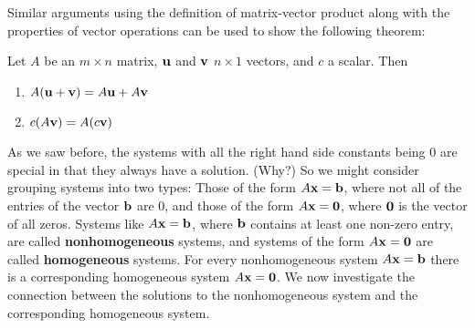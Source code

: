 Similar arguments using the definition of matrix-vector product along with the properties of vector operations can be used to show the following theorem:


\begin{theorem} \label{thm:IMT_1_e} Let $A$ be an $m \times n$ matrix, $\mathbf{u}$ and $\mathbf{v}$ $n \times 1$ vectors, and $c$ a scalar. Then
\begin{enumerate}
\item $A(\mathbf{u} + \mathbf{v}) = A\mathbf{u} + A\mathbf{v}$
\item $c(A\mathbf{v}) = A(c\mathbf{v})$
\end{enumerate}
\end{theorem}


As we saw before, the systems with all the right hand side constants being 0 are special in that they always have a solution. (Why?) So we might consider grouping systems into two types: Those of the form $A \mathbf{x} = \mathbf{b}$, where not all of the entries of the vector $\mathbf{b}$ are $0$, and those of the form $A \mathbf{x} = \mathbf{0}$, where $\mathbf{0}$ is the vector of all zeros. Systems like $A \mathbf{x} = \mathbf{b}$, where $\mathbf{b}$ contains at least one non-zero entry, are called \textbf{nonhomogeneous} systems, and systems of the form $A \mathbf{x} = \mathbf{0}$ are called \textbf{homogeneous} systems. For every nonhomogeneous system $A \mathbf{x} = \mathbf{b}$ there is a corresponding homogeneous system $A \mathbf{x} = \mathbf{0}$. We now investigate the connection between the solutions to the nonhomogeneous system and the corresponding homogeneous system. 

\vspace{0.2cm}


